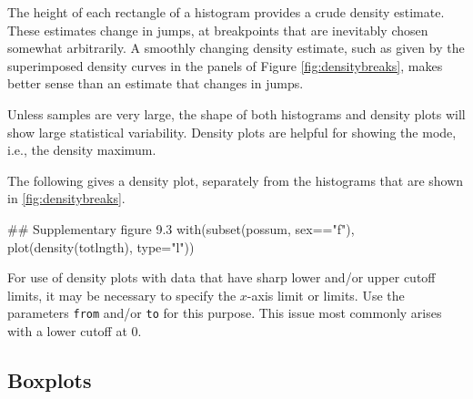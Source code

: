 \documentclass{tufte-book}\usepackage[]{graphicx}\usepackage[]{color}
\newcommand{\txtt}[1]{\texttt{#1}}
\begin{document}
The height of each rectangle of a histogram provides a crude density
estimate. These estimates change in jumps, at breakpoints that are
inevitably chosen somewhat arbitrarily.
A smoothly changing density estimate, such as given by the
superimposed density curves in the panels of Figure
\ref{fig:densitybreaks}, makes better sense than an estimate that
changes in jumps.

Unless samples are very large, the shape of both histograms and
density plots will show large statistical variability.  Density plots
are helpful for showing the mode, i.e., the density maximum.

The following gives a density plot, separately from the histograms that
are shown in \ref{fig:densitybreaks}.
\begin{Schunk}
\begin{Sinput}
## Supplementary figure 9.3
with(subset(possum, sex=="f"),
     plot(density(totlngth), type="l"))
\end{Sinput}
\end{Schunk}

For use of density plots with data that have sharp lower and/or upper
cutoff limits, it may be necessary to specify the $x$-axis limit or
limits. Use the
parameters \txtt{from} and/or \txtt{to} for this purpose. This issue
most commonly arises with a lower cutoff at 0.

\subsection*{Boxplots}
\end{document}
